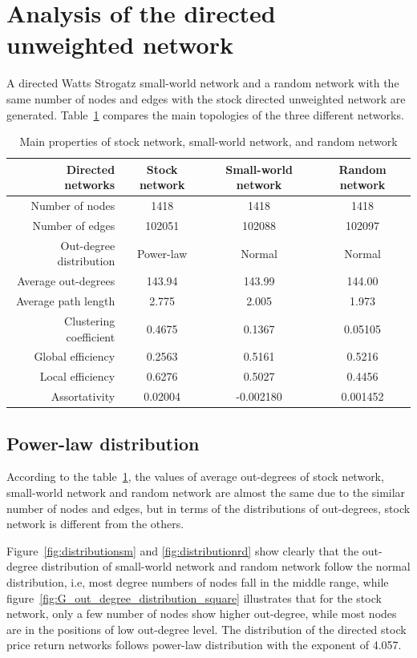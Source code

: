 
\section{Analysis of the directed unweighted network}
A directed Watts Strogatz small-world network and a random network with the same number of nodes and edges with the stock directed unweighted network are generated. Table~\ref{tab:three} compares the main topologies of the three different networks.

\begin{table}
	\begin{center}
		\begin{tabular}{|r|c|c|c|}\hline\hline
			Directed networks&Stock network&Small-world network&Random network\\\hline
			Number of nodes&1418&1418&1418\\
			Number of edges&102051&102088&102097\\
			Out-degree distribution&Power-law&Normal&Normal\\
			Average out-degrees&143.94&143.99&144.00\\
			Average path length&2.775&2.005&1.973\\
			Clustering coefficient&0.4675&0.1367&0.05105\\
			Global efficiency&0.2563&0.5161&0.5216\\
			Local efficiency&0.6276&0.5027&0.4456\\
			Assortativity&0.02004&-0.002180&0.001452\\
			\hline\hline
		\end{tabular}
	\end{center}
	\caption{Main properties of stock network, small-world network, and random network}\label{tab:three}
\end{table}

\subsection{Power-law distribution}
According to the table~\ref{tab:three}, the values of average out-degrees of stock network, small-world network and random network are almost the same due to the similar number of nodes and edges, but in terms of the distributions of out-degrees, stock network is different from the others. 

Figure~\ref{fig:distributionsm} and \ref{fig:distributionrd} show clearly that the out-degree distribution of small-world network and random network follow the normal distribution, i.e, most degree numbers of nodes fall in the middle range, while figure~\ref{fig:G_out_degree_distribution_square} illustrates that for the stock network, only a few number of nodes show higher out-degree, while most nodes are in the positions of low out-degree level. The distribution of the directed stock price return networks follows power-law distribution with the exponent of 4.057.

